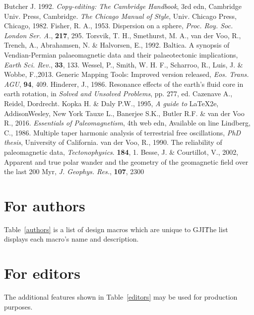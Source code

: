 \begin{thebibliography}{}
    Butcher J. 1992. \textit{Copy-editing: The Cambridge Handbook}, 3rd edn,
    Cambridge Univ. Press, Cambridge.
   \textit{The Chicago Manual of Style}, Univ. Chicago Press,
    Chicago, 1982.
    Fisher, R. A., 1953. Dispersion on a sphere,
    \textit{Proc. Roy. Soc. London Ser. A.}, \textbf{217}, 295.
	Torsvik, T. H., Smethurst, M. A., van der Voo, R., Trench, A., Abrahamsen,
	N. \& Halvorsen, E., 1992. Baltica. A synopsis of Vendian-Permian
	palaeomagnetic data and their palaeotectonic implications, \textit{Earth
	Sci. Rev.}, \textbf{33}, 133.
	Wessel, P., Smith, W. H. F., Scharroo, R., Luis, J. \& Wobbe, F.,2013.
	Generic Mapping Tools: Improved version released, \textit{Eos. Trans. AGU},
	\textbf{94}, 409.
    Hinderer, J., 1986. Resonance effects of the earth's fluid core in earth
    rotation, in \textit{Solved and Unsolved Problems}, pp. 277,
    ed. Cazenave A., Reidel, Dordrecht.
    Kopka H. \& Daly P.W., 1995, \textit{A guide to} \LaTeX2e,
    Addison\textendash{}Wesley, New York
	Tauxe L., Banerjee S.K., Butler R.F. \& van der Voo R., 2016.
	\textit{Essentials of Paleomagnetism}, 4th web edn, Available on line
    Lindberg, C., 1986. Multiple taper harmonic analysis of terrestrial free
    oscillations, \textit{PhD thesis}, University of California.
    van der Voo, R., 1990. The reliability of paleomagnetic data,
	\textit{Tectonophysics}. \textbf{184}, 1.
    Besse, J. \& Courtillot, V., 2002, Apparent and true polar
    wander and the geometry of the geomagnetic field over the last 200 Myr,
   \textit{J. Geophys. Res.}, \textbf{107}, 2300
\end{thebibliography}


\appendix
\section{For authors}

Table~\ref{authors} is a list of design macros which are unique to GJI\. The
list displays each macro's name and description.

\section{For editors}

The additional features shown in Table~\ref{editors} may be used for production
purposes.

\bsp{} %
~\label{lastpage}

